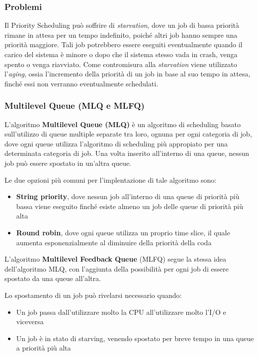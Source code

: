 \documentclass{article}
\begin{document}
\subsubsection*{Problemi}
Il Priority Scheduling può soffrire di \textit{starvation}, dove un job di bassa priorità rimane in attesa per un tempo indefinito, poiché altri job hanno sempre una priorità maggiore. Tali job potrebbero essere eseguiti eventualmente quando il carico del sistema è minore o dopo che il sistema stesso vada in crash, venga spento o venga riavviato. 
Come contromisura alla \textit{starvation} viene utilizzato l'\textit{aging}, ossia l'incremento della priorità di un job in base al suo tempo in attesa, finché essi non verranno eventualmente schedulati.
\pagebreak
\subsubsection{Multilevel Queue (MLQ e MLFQ)}
L'algoritmo \textbf{Multilevel Queue (MLQ)} è un algoritmo di scheduling basato sull'utilizzo di queue multiple separate tra loro, ognuna per ogni categoria di job, dove ogni queue utilizza l'algoritmo di scheduling più appropiato per una determinata categoria di job. Una volta inserito all'interno di una queue, nessun job può essere spostato in un'altra queue.\par
Le due opzioni più comuni per l'implentazione di tale algoritmo sono:
\begin{itemize}
    \item \textbf{String priority}, dove nessun job all'interno di una queue di priorità più bassa viene eseguito finché esiste almeno un job delle queue di priorità più alta
    \item \textbf{Round robin}, dove ogni queue utilizza un proprio time slice, il quale aumenta esponenzialmente al diminuire della priorità della coda
\end{itemize}
L'algoritmo \textbf{Multilevel Feedback Queue} (MLFQ) segue la stessa idea dell'algoritmo MLQ, con l'aggiunta della possibilità per ogni job di essere spostato da una queue all'altra.\par
Lo spostamento di un job può rivelarsi necessario quando:
\begin{itemize}
    \item Un job passa dall'utilizzare molto la CPU all'utilizzare molto l'I/O e viceversa
    \item Un job è in stato di starving, venendo spostato per breve tempo in una queue a priorità più alta
\end{itemize}
\end{document}

